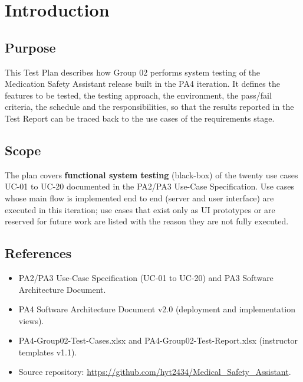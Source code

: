 \documentclass[10pt,letterpaper]{article}
\begin{document}
\section{Introduction}
\subsection{Purpose}
This Test Plan describes how Group 02 performs system testing of the Medication Safety Assistant
release built in the PA4 iteration. It defines the features to be tested, the testing approach, the
environment, the pass/fail criteria, the schedule and the responsibilities, so that the results reported
in the Test Report can be traced back to the use cases of the requirements stage.

\subsection{Scope}
The plan covers \textbf{functional system testing} (black-box) of the twenty use cases UC-01 to UC-20
documented in the PA2/PA3 Use-Case Specification. Use cases whose main flow is implemented end to end
(server and user interface) are executed in this iteration; use cases that exist only as UI prototypes
or are reserved for future work are listed with the reason they are not fully executed.

\subsection{References}
\begin{itemize}
  \item PA2/PA3 Use-Case Specification (UC-01 to UC-20) and PA3 Software Architecture Document.
  \item PA4 Software Architecture Document v2.0 (deployment and implementation views).
  \item PA4-Group02-Test-Cases.xlsx and PA4-Group02-Test-Report.xlsx (instructor templates v1.1).
  \item Source repository: \url{https://github.com/hyt2434/Medical_Safety_Assistant}.
\end{itemize}

\end{document}
